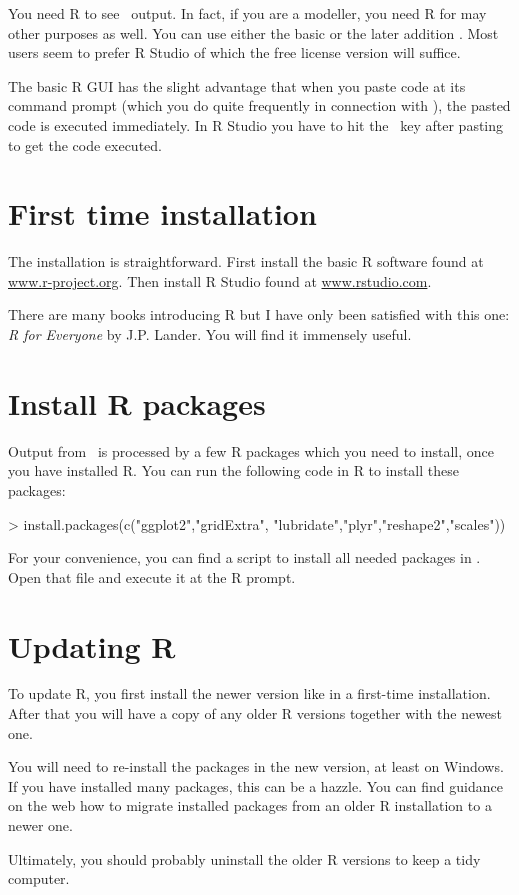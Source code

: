 You need R to see \US\ output. In fact, if you are a modeller, you need R for may other purposes as well. You can use either the basic  or the later addition . Most users seem to prefer R Studio of which the free license version will suffice.

The basic R GUI has the slight advantage that when you paste code at its command prompt (which you do quite frequently in connection with \US), the pasted code is executed immediately. In R Studio you have to hit the \returnkey\ key after pasting to get the code executed.

\section{First time installation}
The installation is straightforward. First install the basic R software found at \url{www.r-project.org}. Then install R Studio found at \url{www.rstudio.com}.

There are many books introducing R but I have only been satisfied with this one:
\textit{R for Everyone} by J.P. Lander. You will find it immensely useful. 

\section{Install R packages}
Output from \US\ is processed by a few  R packages which you need to install, once you have installed R. You can run the following code in R to install these packages:

\begin{rscript}
> install.packages(c("ggplot2","gridExtra",
	"lubridate","plyr","reshape2","scales")) 
\end{rscript}
For your convenience, you can find a script to install all needed packages in  . Open that file and execute it at the R prompt.

\section{Updating R}
To update R, you first install the newer version like in a first-time installation. After that you will have a copy of any older R versions together with the newest one. 

You will need to re-install the packages in the new version, at least on Windows. If you have installed many packages, this can be a hazzle. You can find guidance on the web how to migrate installed packages from an older R installation to a newer one.

Ultimately, you should probably uninstall the older R versions to keep a tidy computer.
